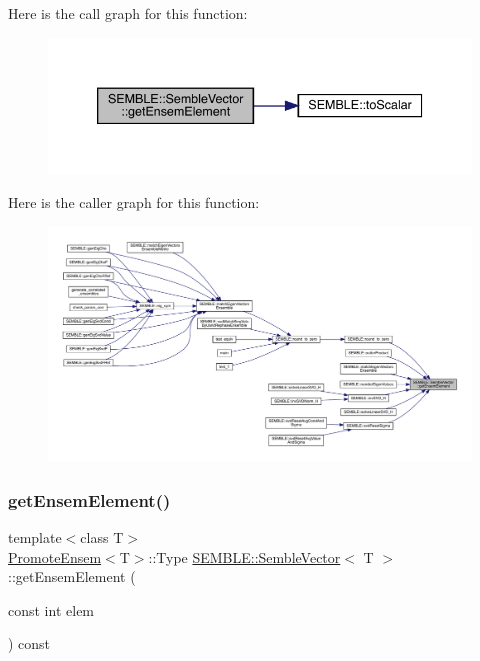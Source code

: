 Here is the call graph for this function\+:
\nopagebreak
\begin{figure}[H]
\begin{center}
\leavevmode
\includegraphics[width=339pt]{d9/d94/structSEMBLE_1_1SembleVector_a51b3272526cbc8cf3e84182e659df0e3_cgraph}
\end{center}
\end{figure}
Here is the caller graph for this function\+:
\nopagebreak
\begin{figure}[H]
\begin{center}
\leavevmode
\includegraphics[width=350pt]{d9/d94/structSEMBLE_1_1SembleVector_a51b3272526cbc8cf3e84182e659df0e3_icgraph}
\end{center}
\end{figure}
\mbox{\label{structSEMBLE_1_1SembleVector_a70c2aeeff708443ca03f03a8b765d84d}} 
\subsubsection{\texorpdfstring{getEnsemElement()}{getEnsemElement()}\hspace{0.1cm}{\footnotesize\ttfamily [2/2]}}
{\footnotesize\ttfamily template$<$class T$>$ \\
\mbox{\hyperlink{structSEMBLE_1_1PromoteEnsem}{Promote\+Ensem}}$<$T$>$\+::Type \mbox{\hyperlink{structSEMBLE_1_1SembleVector}{S\+E\+M\+B\+L\+E\+::\+Semble\+Vector}}$<$ T $>$\+::get\+Ensem\+Element (\begin{DoxyParamCaption}\item[{const int}]{elem }\end{DoxyParamCaption}) const}

